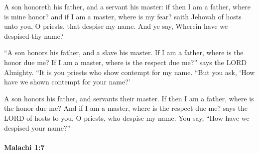 			\begin{versebox}
					\item[BHS] 
					\item[LXX] 
					\item[ASV] A son honoreth his father, and a servant his master: if then I am a father, where is mine honor? and if I am a master, where is my fear? saith Jehovah of hosts unto you, O priests, that despise my name. And ye say, Wherein have we despised thy name?
					\item[NIV] “A son honors his father, and a slave his master. If I am a father, where is the honor due me? If I am a master, where is the respect due me?” says the LORD Almighty. “It is you priests who show contempt for my name. “But you ask, ‘How have we shown contempt for your name?’
					\item[NRSV] A son honors his father, and servants their master. If then I am a father, where is the honor due me? And if I am a master, where is the respect due me? says the LORD of hosts to you, O priests, who despise my name. You say, “How have we despised your name?”
			\end{versebox}

		\paragraph{Malachi 1:7} %
			\label{MALACHI-1-7}

